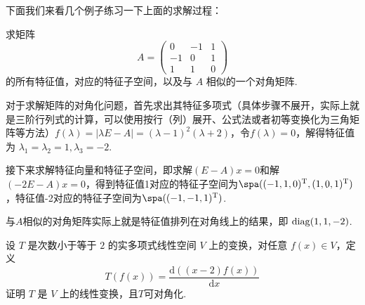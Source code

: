 下面我们来看几个例子练习一下上面的求解过程：
\begin{example}
    求矩阵
    \[A=\begin{pmatrix}
            0  & -1 & 1 \\
            -1 & 0  & 1 \\
            1  & 1  & 0
        \end{pmatrix}\]
    的所有特征值，对应的特征子空间，以及与 $A$ 相似的一个对角矩阵.
\end{example}

\begin{solution}
    对于求解矩阵的对角化问题，首先求出其特征多项式（具体步骤不展开，实际上就是三阶行列式的计算，可以使用按行（列）展开、公式法或者初等变换化为三角矩阵等方法）$f(\lambda)=|\lambda E-A|=(\lambda-1)^2(\lambda+2)$，令$f(\lambda)=0$，解得特征值为 $\lambda_1=\lambda_2=1,\lambda_3=-2$.

    接下来求解特征向量和特征子空间，即求解$(E-A)x=0$和解$(-2E-A)x=0$，得到特征值1对应的特征子空间为$\spa((-1,1,0)^{\mathrm{T}},(1,0,1)^{\mathrm{T}})$，特征值-2对应的特征子空间为$\spa((-1,-1,1)^{\mathrm{T}})$.

    与$A$相似的对角矩阵实际上就是特征值排列在对角线上的结果，即 $\operatorname{diag}(1,1,-2)$.
\end{solution}

\begin{example}
    设 $T$ 是次数小于等于 $2$ 的实多项式线性空间 $V$ 上的变换，对任意 $f(x) \in V$，定义
    \[T(f(x))=\frac{\mathrm{d}((x-2)f(x))}{\mathrm{d}x}\]
    证明 $T$ 是 $V$ 上的线性变换，且$T$可对角化.
\end{example}

